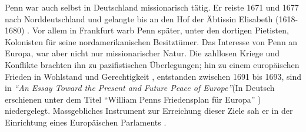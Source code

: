 \medskip

Penn war auch selbst in Deutschland missionarisch tätig. Er reiste 1671 und 1677
nach Norddeutschland  und gelangte bis an den Hof
der Äbtissin Elisabeth (1618-1680) . Vor
allem in Frankfurt  warb Penn später, unter den dortigen
Pietisten,
Kolonisten  für seine nordamerikanischen
 Besitztümer. Das Interesse von Penn an Europa, war
aber nicht nur missionarischer Natur. Die zahllosen Kriege und Konflikte brachten
ihn zu pazifistischen 
Überlegungen; hin zu einem europäischen Frieden  in
Wohlstand  und Gerechtigkeit , entstanden
zwischen 1691 bis 1693, sind in \textit{"`An Essay Toward the Present and Future
Peace of Europe"'}(In Deutsch erschienen unter dem Titel "`William Penns
Friedensplan für Europa"' ) niedergelegt. Massgebliches Instrument zur
Erreichung dieser
Ziele sah er in der Einrichtung eines Europäischen Parlaments
.
